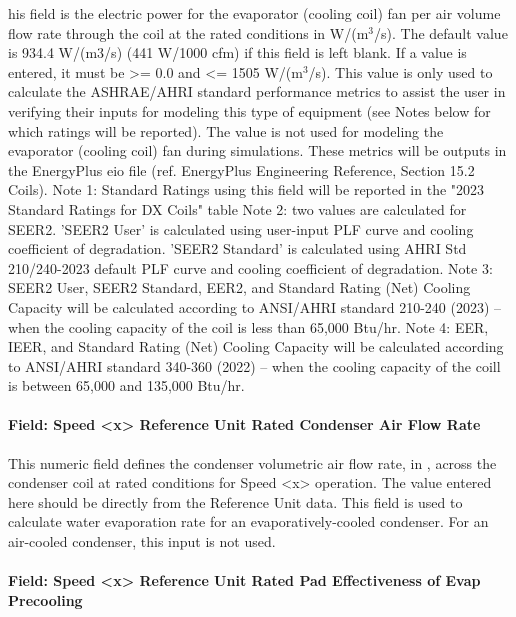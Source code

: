 his field is the electric power for the evaporator (cooling coil) fan per air volume flow rate through the coil at the rated conditions in W/(m\(^{3}\)/s). The default value is 934.4 W/(m3/s) (441 W/1000 cfm) if this field is left blank. If a value is entered, it must be \textgreater{}= 0.0 and \textless{}= 1505 W/(m\(^{3}\)/s). This value is only used to calculate the ASHRAE/AHRI standard performance metrics to assist the user in verifying their inputs for modeling this type of equipment (see Notes below for which ratings will be reported).  The value is not used for modeling the evaporator (cooling coil) fan during simulations.  These metrics will be outputs in the EnergyPlus eio file (ref. EnergyPlus Engineering Reference, Section 15.2 Coils). 
Note 1: Standard Ratings using this field will be reported in the "2023 Standard Ratings for DX Coils" table
Note 2: two values are calculated for SEER2. 'SEER2 User' is calculated using user-input PLF curve and cooling coefficient of degradation. 'SEER2 Standard' is calculated using AHRI Std 210/240-2023 default PLF curve and cooling coefficient of degradation.
Note 3: SEER2 User, SEER2 Standard, EER2, and Standard Rating (Net) Cooling Capacity will be calculated according to ANSI/AHRI standard 210-240 (2023) -- when the cooling capacity of the coil is less than 65,000 Btu/hr.
Note 4: EER, IEER, and Standard Rating (Net) Cooling Capacity will be calculated according to ANSI/AHRI standard 340-360 (2022) -- when the cooling capacity of the coill is between 65,000 and 135,000 Btu/hr.

\paragraph{Field: Speed \textless{}x\textgreater{} Reference Unit Rated Condenser Air Flow Rate}\label{field-speed-x-reference-unit-rated-condenser-air-flow-rate}

This numeric field defines the condenser volumetric air flow rate, in \si{\volumeFlowRate}, across the condenser coil at rated conditions for Speed \textless{}x\textgreater{} operation. The value entered here should be directly from the Reference Unit data. This field is used to calculate water evaporation rate for an evaporatively-cooled condenser. For an air-cooled condenser, this input is not used.

\paragraph{Field: Speed \textless{}x\textgreater{} Reference Unit Rated Pad Effectiveness of Evap Precooling}\label{field-speed-x-reference-unit-rated-pad-effectiveness-of-evap-precooling}

